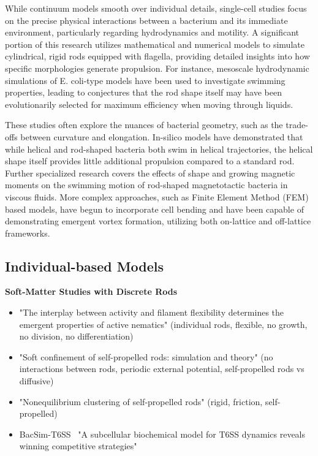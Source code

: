 While continuum models smooth over individual details, single-cell studies focus on the
precise physical interactions between a bacterium and its immediate environment,
particularly regarding hydrodynamics and motility.
A significant portion of this research utilizes mathematical and numerical models to
simulate cylindrical, rigid rods equipped with flagella, providing detailed insights into
how specific morphologies generate propulsion.
For instance, mesoscale hydrodynamic simulations of E.
coli-type models have been used to investigate swimming properties, leading to
conjectures that the rod shape itself may have been evolutionarily selected for maximum
efficiency when moving through liquids.

These studies often explore the nuances of bacterial geometry, such as the trade-offs
between curvature and elongation.
In-silico models have demonstrated that while helical and rod-shaped bacteria both swim
in helical trajectories, the helical shape itself provides little additional propulsion
compared to a standard rod.
Further specialized research covers the effects of shape and growing magnetic moments on
the swimming motion of rod-shaped magnetotactic bacteria in viscous fluids.
More complex approaches, such as Finite Element Method (FEM) based models, have begun to
incorporate cell bending and have been capable of demonstrating emergent vortex
formation, utilizing both on-lattice and off-lattice frameworks.

\subsection{Individual-based Models}

\textbf{Soft-Matter Studies with Discrete Rods}
\begin{itemize}
    \item \cite{Joshi2019} "The interplay between activity and filament flexibility determines the
        emergent properties of active nematics"
        (individual rods, flexible, no growth, no division, no differentiation)
    \item \cite{Modica2024} "Soft confinement of self-propelled rods: simulation and theory"
        (no interactions between rods, periodic external potential, self-propelled rods
        vs diffusive)
    \item \cite{Peruani2006} "Nonequilibrium clustering of self-propelled rods"
        (rigid, friction, self-propelled)
    \item BacSim-T6SS~\cite{Lin2023} "A subcellular biochemical model for T6SS dynamics
        reveals winning competitive strategies"
\end{itemize}

